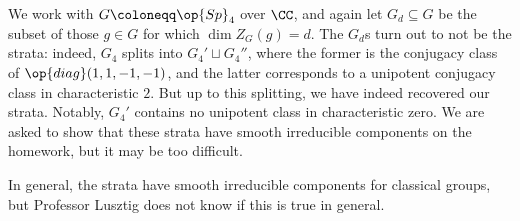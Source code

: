 \documentclass[../notes.tex]{subfiles}
\begin{document}
\begin{example}
	We work with $G\coloneqq\op{Sp}_4$ over $\CC$, and again let $G_d\subseteq G$ be the subset of those $g\in G$ for which $\dim Z_G(g)=d$. The $G_d$s turn out to not be the strata: indeed, $G_4$ splits into $G_4'\sqcup G_4''$, where the former is the conjugacy class of $\op{diag}(1,1,-1,-1)$, and the latter corresponds to a unipotent conjugacy class in characteristic $2$. But up to this splitting, we have indeed recovered our strata. Notably, $G_4'$ contains no unipotent class in characteristic zero. We are asked to show that these strata have smooth irreducible components on the homework, but it may be too difficult.
\end{example}
\begin{remark}
	In general, the strata have smooth irreducible components for classical groups, but Professor Lusztig does not know if this is true in general.
\end{remark}
\end{document}

